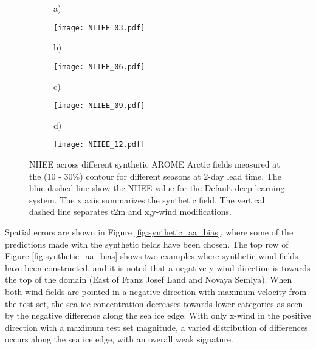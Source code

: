 \documentclass[../main/thesis.tex]{subfiles}
\begin{document}
\begin{figure}
    \centering
    \begin{subfigure}[t]{.015\textwidth}
        a)
    \end{subfigure}
    \begin{subfigure}[t]{0.975\textwidth}
        \texttt{[image: NIIEE\_03.pdf]}
    \end{subfigure}
    \begin{subfigure}[t]{.015\textwidth}
        b)
    \end{subfigure}
    \begin{subfigure}[t]{0.975\textwidth}
        \texttt{[image: NIIEE\_06.pdf]}
    \end{subfigure}
    \begin{subfigure}[t]{.015\textwidth}
        c)
    \end{subfigure}
    \begin{subfigure}[t]{0.975\textwidth}
        \texttt{[image: NIIEE\_09.pdf]}
    \end{subfigure}
    \begin{subfigure}[t]{.015\textwidth}
        d)
    \end{subfigure}
    \begin{subfigure}[t]{0.975\textwidth}
        \texttt{[image: NIIEE\_12.pdf]}
    \end{subfigure}
    \caption{\label{fig:synthetic_aa_niiee}NIIEE across different synthetic AROME Arctic fields measured at the (10 - 30\%) contour for different seasons at 2-day lead time. The blue dashed line show the NIIEE value for the Default deep learning system. The x axis summarizes the synthetic field. The vertical dashed line separates t2m and x,y-wind modifications.}
\end{figure}

Spatial errors are shown in Figure \ref{fig:synthetic_aa_bias}, where some of the predictions made with the synthetic fields have been chosen. The top row of Figure \ref{fig:synthetic_aa_bias} shows two examples where synthetic wind fields have been constructed, and it is noted that a negative y-wind direction is towards the top of the domain (East of Franz Josef Land and Novaya Semlya). When both wind fields are pointed in a negative direction with maximum velocity from the test set, the sea ice concentration decreases towards lower categories as seen by the negative difference along the sea ice edge. With only x-wind in the positive direction with a maximum test set magnitude, a varied distribution of differences occurs along the sea ice edge, with an overall weak signature.
\end{document}
